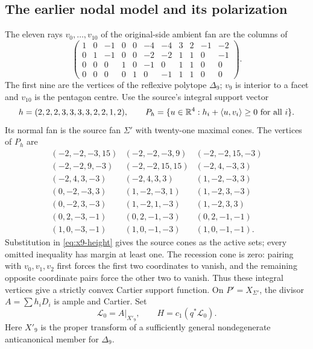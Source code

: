 \subsection{The earlier nodal model and its polarization}
The eleven rays $v_0,\ldots,v_{10}$ of the original-side ambient fan
are the columns of
\begin{equation}\label{eq:x9-rays}
 \begin{pmatrix}
 1&0&-1&0&0&-4&-4&3&2&-1&-2\\
 0&1&-1&0&0&-2&-2&1&1&0&-1\\
 0&0&0&1&0&-1&0&1&1&0&0\\
 0&0&0&0&1&0&-1&1&1&0&0
 \end{pmatrix}.
\end{equation}
The first nine are the vertices of the reflexive polytope $\Delta_9$;
$v_9$ is interior to a facet and $v_{10}$ is the pentagon centre.
Use the source's integral support vector
\begin{equation}\label{eq:x9-height}
 h=(2,2,2,3,3,3,3,2,2,1,2),\qquad
 P_h=\{u\in\mathbb R^4:h_i+\langle u,v_i\rangle\ge0\text{ for all }i\}.
\end{equation}
Its normal fan is the source fan $\Sigma'$ with twenty-one maximal
cones. The vertices of $P_h$ are
\begin{equation}\label{eq:x9-cartier-vertices}
\begin{array}{rrr}
(-2,-2,-3,15)&(-2,-2,-3,9)&(-2,-2,15,-3)\\
(-2,-2,9,-3)&(-2,-2,15,15)&(-2,4,-3,3)\\
(-2,4,3,-3)&(-2,4,3,3)&(1,-2,-3,3)\\
(0,-2,-3,3)&(1,-2,-3,1)&(1,-2,3,-3)\\
(0,-2,3,-3)&(1,-2,1,-3)&(1,-2,3,3)\\
(0,2,-3,-1)&(0,2,-1,-3)&(0,2,-1,-1)\\
(1,0,-3,-1)&(1,0,-1,-3)&(1,0,-1,-1).
\end{array}
\end{equation}
Substitution in \eqref{eq:x9-height} gives the source cones as the
active sets; every omitted inequality has margin at least one.
The recession cone is zero: pairing with $v_0,v_1,v_2$ first forces
the first two coordinates to vanish, and the remaining opposite
coordinate pairs force the other two to vanish. Thus these integral
vertices give a strictly convex Cartier support function. On
$P'=X_{\Sigma'}$, the divisor $A=\sum h_iD_i$ is ample and Cartier.
Set
\begin{equation}\label{eq:x9-polarization}
 \mathcal L_0=A|_{X'_9},\qquad H=c_1(q^*\mathcal L_0).
\end{equation}
Here $X'_9$ is the proper transform of a sufficiently general
nondegenerate anticanonical member for $\Delta_9$.

